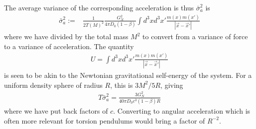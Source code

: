 \documentclass[aps,pra,amsmath,amssymb,amsthm,floatfix,nofootinbib,notitlepage,superscriptaddress,10pt]{revtex4-2}
\begin{document}
The average variance of the corresponding acceleration is thus
$  \bar{\sigma}_a^2$ is 
\begin{align}
	\bar{\sigma}_a^2:=&\frac{1}{2T(M)^2}
	\frac{G_N^2}{4\pi D_{0}(1-\beta)}\int d^3x d^3x' \frac{m(x)m(x')}{|\vec{x}-\vec{x}'|}
\end{align}
where we have divided by the total mass $M^2$ to convert from a variance of force to a variance of acceleration. The quantity  
\begin{align}
	U=\int d^3x d^3x' \frac{m(x)m(x')}{|\vec{x}-\vec{x}'|}
\end{align}
is seen to be akin to the Newtonian gravitational self-energy of the system. For a uniform density sphere of radius $R$, this is $3M^2/5R$, giving
\begin{align}
	T \bar{\sigma}_a^2= \frac{3G_N^2}{40\pi D_{0}c^3(1-\beta) R}
	\label{eq:SphereSpec}
\end{align}
where we have put back factors of $c$. Converting to angular acceleration which is often more relevant for torsion pendulums would bring a factor of $R^{-2}$. 
\end{document}

